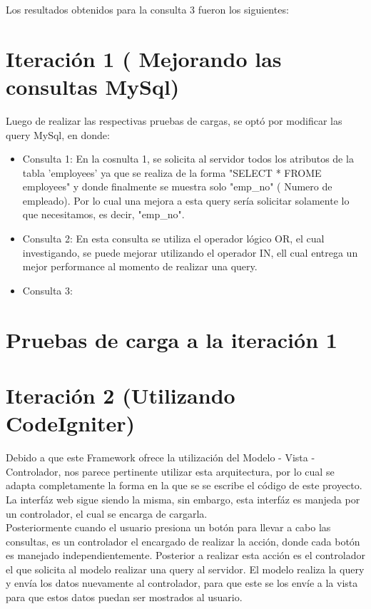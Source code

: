 Los resultados obtenidos para la consulta 3 fueron los siguientes: 
 
\section{Iteración 1 ( Mejorando las consultas MySql)} 

Luego de realizar las respectivas pruebas de cargas, se optó por modificar las query MySql, en donde: 


\begin{itemize}
	\item Consulta 1: En la cosnulta 1, se solicita al servidor todos los atributos de la tabla 'employees' ya que se realiza de la forma "SELECT * FROME employees" y donde finalmente se muestra solo "emp\_no" ( Numero de empleado). Por lo cual una mejora a esta query sería solicitar solamente lo que necesitamos, es decir, "emp\_no".\\
	
	\item Consulta 2: En esta consulta se utiliza el operador lógico OR, el cual investigando, se puede mejorar utilizando el operador IN, ell cual entrega un mejor performance al momento de realizar una query.\\
	
	\item Consulta 3: 
\end{itemize}

\section{Pruebas de carga a la iteración 1}

\section{Iteración 2 (Utilizando CodeIgniter)}

Debido a que este Framework ofrece la utilización del Modelo - Vista - Controlador, nos parece pertinente utilizar esta arquitectura, por lo cual se adapta completamente la forma en la que se se escribe el código de este proyecto. \\

La interfáz web sigue siendo la misma, sin embargo, esta interfáz es manjeda por un controlador, el cual se encarga de cargarla.\\

Posteriormente cuando el usuario presiona un botón para llevar a cabo las consultas, es un controlador el encargado de realizar la acción, donde cada botón es manejado independientemente. Posterior a realizar esta acción es el controlador el que solicita al modelo realizar una query al servidor. El modelo realiza la query y envía los datos nuevamente al controlador, para que este se los envíe a la vista para que estos datos puedan ser mostrados al usuario. 

